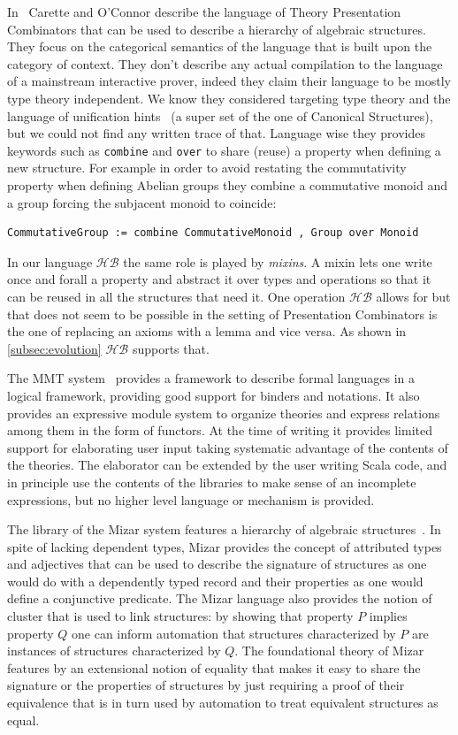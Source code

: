 \documentclass[a4paper,UKenglish,cleveref, autoref]{lipics-v2019}
\newcommand{\HB}{\ensuremath{\mathcal{HB}}}
\newcommand{\mixin}{mixin}
\newcommand{\mixins}{mixins}
\theoremstyle{implem}
\theoremstyle{implem}
\theoremstyle{command}
\begin{document}
{{In~\cite{CaretteCombinators} Carette and O'Connor describe the language of
Theory Presentation Combinators that can be used to describe a hierarchy of
algebraic structures.
They focus on the categorical semantics of the language that is built upon
the category of context.
They don't describe any actual compilation to the language of a mainstream
interactive prover, indeed they claim their language to be mostly type theory
independent. We know they considered targeting type theory and the language
of unification hints~\cite{10.1007/978-3-642-03359-9_8}
(a super set of the one of Canonical Structures),
but we could not find any written trace of that. Language wise they provides
keywords such as \verb+combine+ and \verb+over+ to share (reuse) a property
when defining a new structure. For example in order to avoid restating
the commutativity property when defining Abelian groups they combine
a commutative monoid and a group forcing the subjacent monoid to coincide:
\begin{verbatim}
CommutativeGroup := combine CommutativeMonoid , Group over Monoid
\end{verbatim}
In our language \HB{} the same role is played by \emph{\mixins{}}.
A \mixin{} lets one write once and forall a property and abstract it over types
and operations so that it can be reused in all the structures that need it.
One operation \HB{} allows for but that does not seem to be possible in the
setting of Presentation Combinators is the one of replacing an axioms with a
lemma and vice versa. As shown in \autoref{subsec:evolution} \HB{} supports
that.

The MMT system~\cite{RABE20131} provides a framework to describe formal
languages in a logical framework, providing good support for binders and
notations. It also provides an expressive module system to organize
theories and express relations among them in the form of functors.
At the time of writing
it provides limited support for elaborating user input taking systematic
advantage of the contents of the theories. The elaborator can be extended
by the user writing Scala code, and in principle use the contents of the
libraries to make sense of an incomplete expressions, but no higher level
language or mechanism is provided.

The library of the Mizar system features a hierarchy of algebraic
structures~\cite{7733265}. In spite of lacking dependent types, Mizar
provides the concept of attributed types and adjectives
that can be used to describe the signature of structures as one would
do with a dependently typed record and their properties as
one would define a conjunctive predicate.
The Mizar language also provides the notion of cluster that is used
to link structures: by showing that property $P$ implies property $Q$
one can inform automation that structures characterized by $P$ are
instances of structures characterized by $Q$. The foundational theory of Mizar
features by an extensional notion of equality that makes it easy
to share the signature or the properties of structures by just requiring
a proof of their equivalence that is in turn used by automation to treat
equivalent structures as equal.

}}
\end{document}
